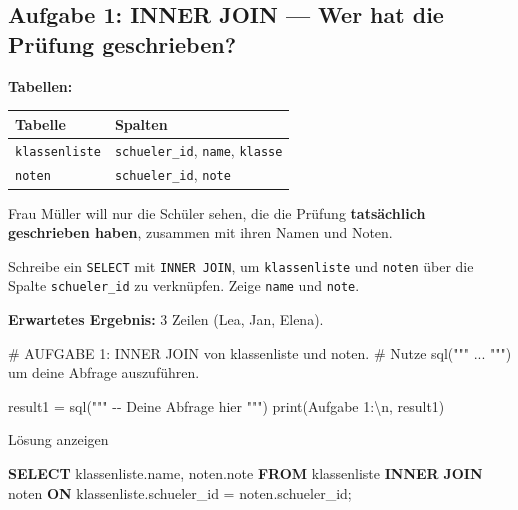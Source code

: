 \documentclass[
  nswissgerman,
  a4paper,
  DIV=11,
  numbers=noendperiod,
  ngerman]{scrreprt}
\newenvironment{Shaded}{\begin{snugshade}}{\end{snugshade}}
\newcommand{\BuiltInTok}[1]{\textcolor[rgb]{0.00,0.23,0.31}{#1}}
\newcommand{\CharTok}[1]{\textcolor[rgb]{0.13,0.47,0.30}{#1}}
\newcommand{\CommentTok}[1]{\textcolor[rgb]{0.37,0.37,0.37}{#1}}
\newcommand{\KeywordTok}[1]{\textcolor[rgb]{0.00,0.23,0.31}{\textbf{#1}}}
\newcommand{\NormalTok}[1]{\textcolor[rgb]{0.00,0.23,0.31}{#1}}
\newcommand{\OperatorTok}[1]{\textcolor[rgb]{0.37,0.37,0.37}{#1}}
\newcommand{\StringTok}[1]{\textcolor[rgb]{0.13,0.47,0.30}{#1}}
\newcounter{none} %
\begin{document}
\subsection{Aufgabe 1: INNER JOIN --- Wer hat die Prüfung
geschrieben?}\label{aufgabe-1-inner-join-wer-hat-die-pruxfcfung-geschrieben}

\textbf{Tabellen:}

{\def\LTcaptype{none} %
\begin{longtable}[]{@{}ll@{}}
\toprule\noalign{}
Tabelle & Spalten \\
\midrule\noalign{}
\endhead
\bottomrule\noalign{}
\endlastfoot
\texttt{klassenliste} & \texttt{schueler\_id}, \texttt{name},
\texttt{klasse} \\
\texttt{noten} & \texttt{schueler\_id}, \texttt{note} \\
\end{longtable}
}

Frau Müller will nur die Schüler sehen, die die Prüfung
\textbf{tatsächlich geschrieben haben}, zusammen mit ihren Namen und
Noten.

Schreibe ein \texttt{SELECT} mit \texttt{INNER\ JOIN}, um
\texttt{klassenliste} und \texttt{noten} über die Spalte
\texttt{schueler\_id} zu verknüpfen. Zeige \texttt{name} und
\texttt{note}.

\textbf{Erwartetes Ergebnis:} 3 Zeilen (Lea, Jan, Elena).

\begin{Shaded}
\begin{Highlighting}[numbers=left,,]
\CommentTok{\# AUFGABE 1: INNER JOIN von klassenliste und noten.}
\CommentTok{\# Nutze sql(""" ... """) um deine Abfrage auszuführen.}

\NormalTok{result1 }\OperatorTok{=}\NormalTok{ sql(}\StringTok{"""}
\StringTok{{-}{-} Deine Abfrage hier}
\StringTok{"""}\NormalTok{)}
\BuiltInTok{print}\NormalTok{(}\StringTok{\textquotesingle{}Aufgabe 1:}\CharTok{\textbackslash{}n}\StringTok{\textquotesingle{}}\NormalTok{, result1)}
\end{Highlighting}
\end{Shaded}

Lösung anzeigen

\begin{Shaded}
\begin{Highlighting}[numbers=left,,]
\KeywordTok{SELECT}\NormalTok{ klassenliste.name, noten.note}
\KeywordTok{FROM}\NormalTok{ klassenliste}
\KeywordTok{INNER} \KeywordTok{JOIN}\NormalTok{ noten}
  \KeywordTok{ON}\NormalTok{ klassenliste.schueler\_id }\OperatorTok{=}\NormalTok{ noten.schueler\_id;}
\end{Highlighting}
\end{Shaded}
\end{document}
